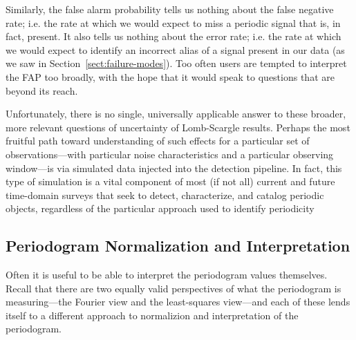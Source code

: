 \documentclass[preprint]{aastex}
\newcommand{\Sect}[1]{Section~\ref{sect:#1}}
\newcommand{\sect}[1]{\Sect{#1}}
\newcommand{\sectlabel}[1]{\label{sect:#1}}
\begin{document}
Similarly, the false alarm probability tells us nothing about the false
negative rate; {i.e.} the rate at which
we would expect to miss a periodic signal that is, in fact, present.
It also tells us nothing about the error rate; {i.e.} the rate at which we
would expect to identify an incorrect alias of a signal present in our data
(as we saw in \sect{failure-modes}).
Too often users are tempted to interpret the FAP too broadly, with the hope that
it would speak to questions that are beyond its reach.

Unfortunately, there is no single, universally applicable answer to
these broader, more relevant questions of uncertainty of Lomb-Scargle results.
Perhaps the most fruitful path toward understanding of such effects for a
particular set of observations---with particular noise characteristics and a
particular observing window---is via simulated data injected into the detection
pipeline.
In fact, this type of simulation is a vital component of most (if not all)
current and future time-domain surveys that seek to
detect, characterize, and catalog periodic objects,
regardless of the particular approach used to identify periodicity
\citep[see, e.g.][etc.]{opsim1, opsim2, Ivezic08LSST, Sesar2010,
  Oluseyi12, McQuillan2012, Drake2014}



\subsection{Periodogram Normalization and Interpretation}
\sectlabel{normalizations}

Often it is useful to be able to interpret the periodogram values themselves.
Recall that there are two equally valid perspectives of what the periodogram
is measuring---the Fourier view and the least-squares view---and each of these
lends itself to a different approach to normalizion and interpretation of the
periodogram.
\end{document}
